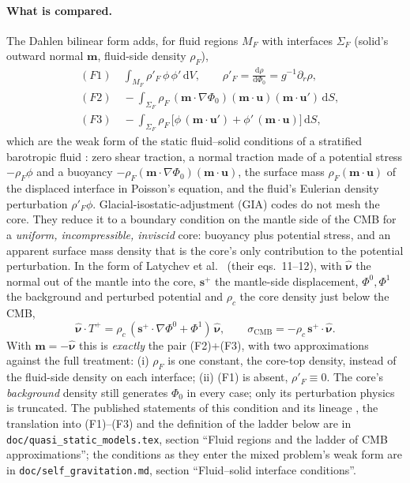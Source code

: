 \documentclass[11pt]{article}
\numberwithin{equation}{section}
\newcommand{\dS}{\,\mathrm{d}S}
\newcommand{\dV}{\,\mathrm{d}V}
\newcommand{\vu}{\mathbf{u}}
\newcommand{\vm}{\mathbf{m}}
\newcommand{\vs}{\mathbf{s}}
\newcommand{\code}[1]{\texttt{#1}}
\begin{document}
\paragraph{What is compared.}
The Dahlen bilinear form adds, for fluid regions $M_F$ with interfaces
$\Sigma_F$ (solid's outward normal $\vm$, fluid-side density $\rho_F$),
\begin{align}
 &(F1)\quad \int_{M_F}\rho'_F\,\phi\,\phi'\dV, \qquad \rho'_F = \frac{\mathrm{d}\rho}{\mathrm{d}\Phi_0}
   = g^{-1}\partial_r\rho, \\
 &(F2)\quad -\int_{\Sigma_F}\rho_F\,(\vm\cdot\nabla\Phi_0)(\vm\cdot\vu)(\vm\cdot\vu')\dS, \\
 &(F3)\quad -\int_{\Sigma_F}\rho_F\,\bigl[\phi\,(\vm\cdot\vu') + \phi'\,(\vm\cdot\vu)\bigr]\dS ,
\end{align}
which are the weak form of the static fluid--solid conditions of a
stratified barotropic fluid \cite{Dahlen1974,AW10}: zero shear traction, a
normal traction made of a potential stress $-\rho_F\phi$ and a buoyancy
$-\rho_F(\vm\cdot\nabla\Phi_0)(\vm\cdot\vu)$, the surface mass
$\rho_F(\vm\cdot\vu)$ of the displaced interface in Poisson's equation, and
the fluid's Eulerian density perturbation $\rho'_F\phi$.
Glacial-isostatic-adjustment (GIA) codes do not mesh the core. They reduce
it to a boundary condition on the mantle side of the CMB for a
\emph{uniform, incompressible, inviscid} core: buoyancy plus potential
stress, and an apparent surface mass density that is the core's only
contribution to the potential perturbation. In the form of Latychev et al.\
\cite{Latychev2005} (their eqs.~11--12), with $\hat{\bm\nu}$ the normal out
of the mantle into the core, $\vs^+$ the mantle-side displacement,
$\Phi^0,\Phi^1$ the background and perturbed potential and $\rho_c$ the core
density just below the CMB,
\begin{equation}
  \hat{\bm{\nu}}\cdot T^+ = \rho_c\,(\vs^+\cdot\nabla\Phi^0 + \Phi^1)\,
    \hat{\bm{\nu}}, \qquad
  \sigma_{\mathrm{CMB}} = -\rho_c\,\vs^+\cdot\hat{\bm{\nu}} .
  \label{eq:latychev}
\end{equation}
With $\vm=-\hat{\bm\nu}$ this is \emph{exactly} the pair (F2)+(F3), with
two approximations against the full treatment: (i) $\rho_F$ is one
constant, the core-top density, instead of the fluid-side density on each
interface; (ii) (F1) is absent, $\rho'_F\equiv0$. The core's
\emph{background} density still generates $\Phi_0$ in every case; only its
perturbation physics is truncated. The published statements of this
condition and its lineage
\cite{WuPeltier1982,TrompMitrovica1999,Martinec1999,Martinec2000,Zhong2003,AWahrZhong2013,Huang2023,CitcomSVE2025,Spada2011,WuNi1996},
the translation into (F1)--(F3) and the definition of the ladder below are
in \code{doc/quasi\_static\_models.tex}, section ``Fluid regions and the
ladder of CMB approximations''; the conditions as they enter the mixed
problem's weak form are in \code{doc/self\_gravitation.md}, section
``Fluid--solid interface conditions''.
\end{document}
